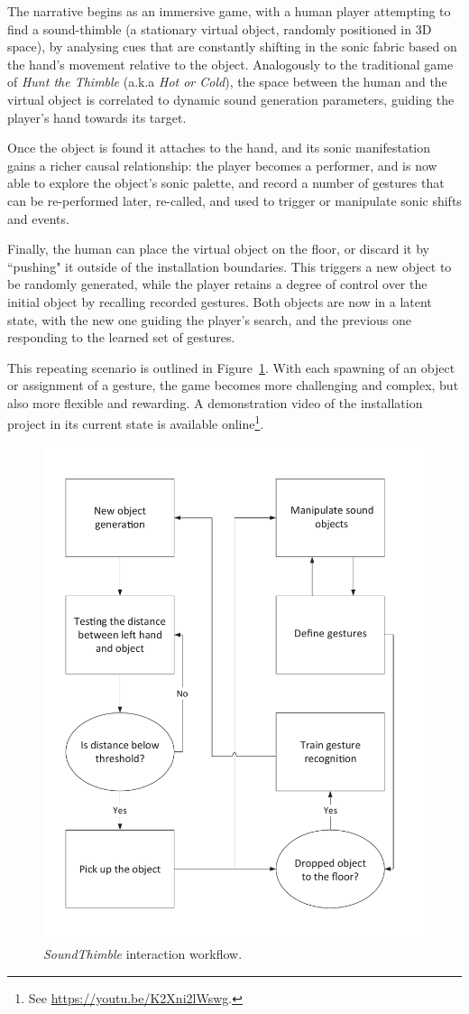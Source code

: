 The narrative begins as an immersive game, with a human player attempting to find a sound-thimble (a stationary virtual object, randomly positioned in 3D space), by analysing cues that are constantly shifting in the sonic fabric based on the hand's movement relative to the object. Analogously to the traditional game of \textit{Hunt the Thimble} (a.k.a \textit{Hot or Cold}), the space between the human and the virtual object is correlated to dynamic sound generation parameters, guiding the player's hand towards its target.

Once the object is found it attaches to the hand, and its sonic manifestation gains a richer causal relationship: the player becomes a performer, and is now able to explore the object's sonic palette, and record a number of gestures that can be re-performed later, re-called, and used to trigger or manipulate sonic shifts and events.

Finally, the human can place the virtual object on the floor, or discard it by ``pushing" it outside of the installation boundaries. This triggers a new object to be randomly generated, while the player retains a degree of control over the initial object by recalling recorded gestures. Both objects are now in a latent state, with the new one guiding the player's search, and the previous one responding to the learned set of gestures.

This repeating scenario is outlined in Figure~\ref{fig:concept}. %
With each spawning of an object or assignment of a gesture, the game becomes more challenging and complex, but also more flexible and rewarding. A demonstration video of the installation project in its current state is available online\footnote{See \url{https://youtu.be/K2Xni2lWswg}.}.


\begin{figure}[t]
	\centering
	\includegraphics[width=.65\columnwidth, clip, trim={0 .55cm 0 0}]{img/concept}
	\caption{\textit{SoundThimble} interaction workflow.}
	\label{fig:concept}
\end{figure}

